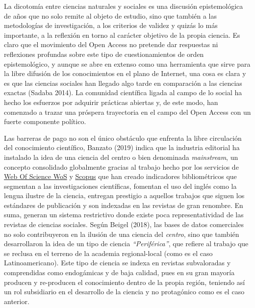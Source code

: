 \documentclass[
  spanish,
  letterpaper,
  DIV=11,
  numbers=noendperiod]{scrreprt}
\begin{document}
La dicotomía entre ciencias naturales y sociales es una discusión
epistemológica de años que no solo remite al objeto de estudio, sino que
también a las metodologías de investigación, a los criterios de validez
y quizás lo más importante, a la reflexión en torno al carácter objetivo
de la propia ciencia. Es claro que el movimiento del Open Access no
pretende dar respuestas ni reflexiones profundas sobre este tipo de
cuestionamientos de orden epistemológico, y aunque se abre en extenso
como una herramienta que sirve para la libre difusión de los
conocimientos en el plano de Internet, una cosa es clara y es que las
ciencias sociales han llegado algo tarde en comparación a las ciencias
exactas (Sadaba 2014). La comunidad científica ligada al campo de lo
social ha hecho los esfuerzos por adquirir prácticas abiertas y, de este
modo, han comenzado a trazar una próspera trayectoria en el campo del
Open Access con un fuerte componente político.

Las barreras de pago no son el único obstáculo que enfrenta la libre
circulación del conocimiento científico, Banzato (2019) indica que la
industria editorial ha instalado la idea de una ciencia del centro o
bien denominada \emph{mainstream}, un concepto consolidado globalmente
gracias al trabajo hecho por los servicios de
\href{https://clarivate.com/webofsciencegroup/release-notes/wos/new-wos-admin-faq/}{Web
Of Science WoS} y
\href{https://www.elsevier.com/solutions/scopus?dgcid=RN_AGCM_Sourced_300005030}{Scopus}
que han creado indicadores bibliométricos que segmentan a las
investigaciones científicas, fomentan el uso del inglés como la lengua
ilustre de la ciencia, entregan prestigio a aquellos trabajos que siguen
los estándares de publicación y son indexadas en las revistas de gran
renombre. En suma, generan un sistema restrictivo donde existe poca
representatividad de las revistas de ciencias sociales. Según Beigel
(2018), las bases de datos comerciales no solo contribuyeron en la
ilusión de una ciencia del \emph{centro}, sino que también desarrollaron
la idea de un tipo de ciencia \emph{``Periférica''}, que refiere al
trabajo que se reclusa en el terreno de la academia regional-local (como
es el caso Latinoamericano). Este tipo de ciencia se indexa en revistas
subvaloradas y comprendidas como endogámicas y de baja calidad, pues en
su gran mayoría producen y re-producen el conocimiento dentro de la
propia región, teniendo así un rol subsidiario en el desarrollo de la
ciencia y no protagónico como es el caso anterior.
\end{document}
